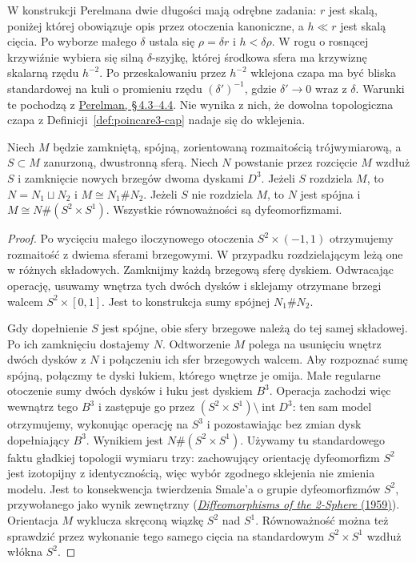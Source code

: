 W konstrukcji Perelmana dwie długości mają
odrębne zadania: $r$ jest skalą, poniżej
której obowiązuje opis przez otoczenia
kanoniczne, a $h\ll r$ jest skalą cięcia.
Po wyborze małego $\delta$ ustala się
$\rho=\delta r$ i $h<\delta\rho$.
W rogu o rosnącej krzywiźnie wybiera się
silną $\delta$-szyjkę, której środkowa sfera
ma krzywiznę skalarną rzędu $h^{-2}$.
Po przeskalowaniu przez $h^{-2}$ wklejona
czapa ma być bliska standardowej na kuli
o promieniu rzędu $(\delta')^{-1}$,
gdzie $\delta'\to0$ wraz z $\delta$.
Warunki te pochodzą z
\href{https://arxiv.org/html/math/0303109}
{Perelman, \S\,4.3--4.4}. Nie wynika z nich,
że dowolna topologiczna czapa z
Definicji~\ref{def:poincare3-cap} nadaje się
do wklejenia.

\begin{lemat}
\label{lem:poincare3-sphere-cut}
Niech $M$ będzie zamkniętą, spójną,
zorientowaną rozmaitością trójwymiarową, a
$S\subset M$ zanurzoną, dwustronną sferą.
Niech $N$ powstanie przez rozcięcie $M$
wzdłuż $S$ i zamknięcie nowych brzegów
dwoma dyskami $D^3$.
Jeżeli $S$ rozdziela $M$, to $N=N_1\sqcup N_2$
i $M\cong N_1\#N_2$.
Jeżeli $S$ nie rozdziela $M$, to $N$ jest spójna
i $M\cong N\#(S^2\times S^1)$.
Wszystkie równoważności są dyfeomorfizmami.
\end{lemat}
\begin{proof}
Po wycięciu małego iloczynowego otoczenia
$S^2\times(-1,1)$ otrzymujemy rozmaitość
z dwiema sferami brzegowymi. W przypadku
rozdzielającym leżą one w różnych składowych.
Zamknijmy każdą brzegową sferę dyskiem.
Odwracając operację, usuwamy wnętrza tych
dwóch dysków i sklejamy otrzymane brzegi
walcem $S^2\times[0,1]$. Jest to konstrukcja
sumy spójnej $N_1\#N_2$.

Gdy dopełnienie $S$ jest spójne, obie sfery
brzegowe należą do tej samej składowej.
Po ich zamknięciu dostajemy $N$.
Odtworzenie $M$ polega na usunięciu wnętrz
dwóch dysków z $N$ i połączeniu ich sfer
brzegowych walcem. Aby rozpoznać sumę spójną,
połączmy te dyski łukiem, którego wnętrze je omija.
Małe regularne otoczenie sumy dwóch dysków i łuku
jest dyskiem $B^3$. Operacja zachodzi więc wewnątrz
tego $B^3$ i zastępuje go przez
$(S^2\times S^1)\setminus\operatorname{int}D^3$:
ten sam model otrzymujemy, wykonując operację na $S^3$
i pozostawiając bez zmian dysk dopełniający $B^3$.
Wynikiem jest $N\#(S^2\times S^1)$.
Używamy tu standardowego faktu gładkiej topologii wymiaru
trzy: zachowujący orientację dyfeomorfizm $S^2$ jest
izotopijny z identycznością, więc wybór zgodnego sklejenia
nie zmienia modelu. Jest to konsekwencja twierdzenia Smale'a
o grupie dyfeomorfizmów $S^2$, przywołanego jako wynik
zewnętrzny (\href{https://doi.org/10.1090/S0002-9939-1959-0112149-8}
{\emph{Diffeomorphisms of the 2-Sphere} (1959)}).
Orientacja $M$ wyklucza skręconą wiązkę $S^2$ nad $S^1$.
Równoważność można też sprawdzić przez
wykonanie tego samego cięcia na standardowym
$S^2\times S^1$ wzdłuż włókna $S^2$.
\end{proof}

